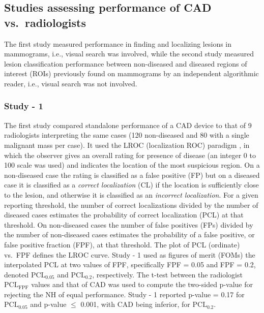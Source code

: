 \documentclass[
]{book}
\begin{document}
\hypertarget{standalone-cad-radiologists-two-previous-studies}{%
\subsection{Studies assessing performance of CAD vs.~radiologists}\label{standalone-cad-radiologists-two-previous-studies}}

The first study \citep{hupse2013standalone} measured performance in finding and localizing lesions in mammograms, i.e., visual search was involved, while the second study \citep{kooi2016comparison} measured lesion classification performance between non-diseased and diseased regions of interest (ROIs) previously found on mammograms by an independent algorithmic reader, i.e., visual search was not involved.

\hypertarget{standalone-cad-radiologists-study1}{%
\subsubsection{Study - 1}\label{standalone-cad-radiologists-study1}}

The first study \citep{hupse2013standalone} compared standalone performance of a CAD device to that of 9 radiologists interpreting the same cases (120 non-diseased and 80 with a single malignant mass per case). It used the LROC (localization ROC) paradigm \citep{starr1975visual, metz1976observer, swensson1996unified}, in which the observer gives an overall rating for presence of disease (an integer 0 to 100 scale was used) and indicates the location of the most suspicious region. On a non-diseased case the rating is classified as a false positive (FP) but on a diseased case it is classified as a \emph{correct localization} (CL) if the location is sufficiently close to the lesion, and otherwise it is classified as an \emph{incorrect localization}. For a given reporting threshold, the number of correct localizations divided by the number of diseased cases estimates the probability of correct localization (PCL) at that threshold. On non-diseased cases the number of false positives (FPs) divided by the number of non-diseased cases estimates the probability of a false positive, or false positive fraction (FPF), at that threshold. The plot of PCL (ordinate) vs.~FPF defines the LROC curve. Study - 1 used as figures of merit (FOMs) the interpolated PCL at two values of FPF, specifically FPF = 0.05 and FPF = 0.2, denoted \(\text{PCL}_{0.05}\) and \(\text{PCL}_{0.2}\), respectively. The t-test between the radiologist \(\text{PCL}_{\text{FPF}}\) values and that of CAD was used to compute the two-sided p-value for rejecting the NH of equal performance. Study - 1 reported p-value = 0.17 for \(\text{PCL}_{0.05}\) and p-value \(\leq\) 0.001, with CAD being inferior, for \(\text{PCL}_{0.2}\).
\end{document}

